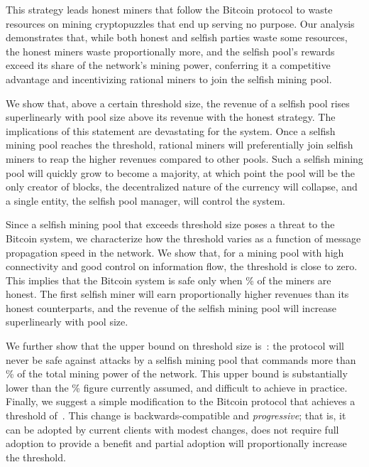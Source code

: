 \documentclass[letterpaper]{llncs}
\begin{document}
This strategy leads honest miners that follow the Bitcoin protocol to waste resources on mining cryptopuzzles that end up serving no purpose. 
Our analysis demonstrates that, while both honest and selfish parties waste some resources, the honest miners waste proportionally more, and the selfish pool's rewards exceed its share of the network's mining power, conferring it a competitive advantage and incentivizing rational miners to join the selfish mining pool.

We show that, above a certain threshold size, the revenue of a selfish pool rises superlinearly with pool size above its revenue with the honest strategy. The implications of this statement are devastating for the system. Once a selfish mining pool reaches the threshold, rational miners will preferentially join selfish miners to reap the higher revenues compared to other pools. Such a selfish mining pool will quickly grow to become a majority, at which point the pool will be the only creator of blocks, the decentralized nature of the currency will collapse, and a single entity, the selfish pool manager, will control the system. 

Since a selfish mining pool that exceeds threshold size poses a threat to the Bitcoin system, we characterize how the threshold varies as a function of 
message propagation speed in the network. We show that, for a mining pool with high connectivity and good control on information flow, the threshold is close to zero. This implies
that the Bitcoin system is safe only when \% of the miners are honest. The first selfish miner will earn proportionally higher revenues than its honest counterparts, and the revenue of the selfish mining pool will increase superlinearly with pool size. 

We further show that the upper bound on threshold size is~: the protocol will never be safe against attacks by a selfish mining pool that commands more than \% of the total mining power of the network. This upper bound is substantially lower than the \% figure currently assumed, and difficult to achieve in practice.
Finally, we suggest a simple modification to the Bitcoin protocol that achieves a threshold of~. This change is backwards-compatible and \emph{progressive}; that is, it can be adopted by current clients with modest changes, does not require full adoption to provide a benefit and partial adoption will proportionally increase the threshold. 
\end{document}
